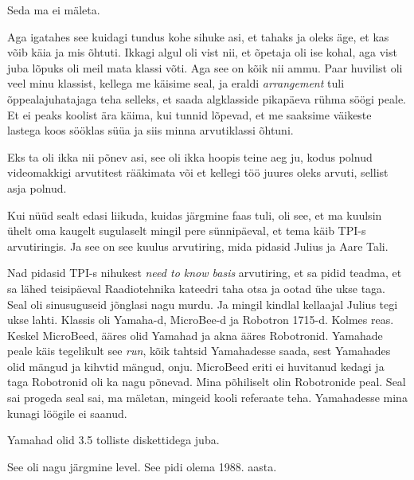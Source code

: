 
Seda ma ei mäleta. 

Aga igatahes see kuidagi tundus kohe sihuke asi, et tahaks ja oleks äge, et kas 
võib käia ja mis õhtuti. Ikkagi algul oli vist nii, et õpetaja oli ise kohal, 
aga vist  juba lõpuks oli meil mata klassi võti. Aga see on kõik nii ammu. Paar huvilist 
oli veel minu klassist, kellega me käisime seal, ja eraldi \emph{arrangement} 
tuli õppealajuhatajaga teha selleks, et saada algklasside pikapäeva rühma söögi 
peale. Et ei peaks koolist ära käima, kui tunnid lõpevad, et me saaksime 
väikeste lastega koos sööklas süüa ja siis minna arvutiklassi õhtuni. 

Eks ta oli ikka nii põnev asi, see oli ikka hoopis teine aeg ju, kodus polnud 
videomakkigi arvutitest rääkimata või et kellegi töö juures oleks arvuti, 
sellist asja polnud. 

Kui nüüd sealt edasi liikuda, kuidas järgmine faas tuli, oli see, et ma kuulsin 
ühelt oma kaugelt sugulaselt mingil pere sünnipäeval, et tema käib TPI-s 
arvutiringis. Ja see on see kuulus 
arvutiring, mida pidasid Julius ja Aare Tali. 

Nad pidasid TPI-s nihukest \emph{need to know 
basis} arvutiring, et sa pidid teadma, et sa lähed teisipäeval Raadiotehnika 
kateedri taha otsa ja 
ootad ühe ukse taga. Seal oli sinusuguseid jõnglasi nagu murdu. Ja mingil 
kindlal kellaajal Julius tegi ukse lahti. Klassis oli  
Yamaha-d, MicroBee-d ja 
Robotron 1715-d. Kolmes reas. Keskel 
MicroBeed,  ääres olid Yamahad ja akna ääres Robotronid. Yamahade peale käis 
tegelikult see \emph{run},  kõik tahtsid Yamahadesse saada, sest Yamahades olid 
mängud ja kihvtid mängud, onju. MicroBeed eriti ei huvitanud kedagi ja taga 
Robotronid oli ka nagu põnevad. Mina põhiliselt olin Robotronide peal. Seal sai 
progeda seal sai, ma mäletan, mingeid kooli referaate teha. Yamahadesse mina 
kunagi löögile ei saanud. 

Yamahad olid 3.5 tolliste diskettidega juba. 

See oli nagu järgmine level. See pidi olema 1988. aasta.

